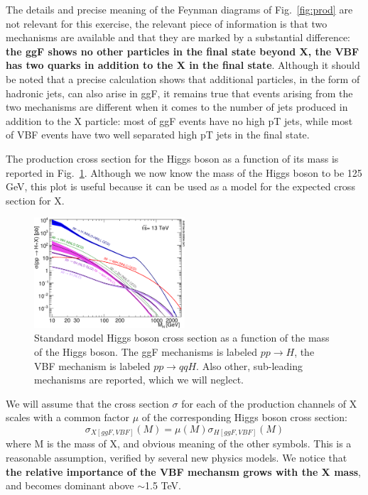 \documentclass[a4paper,12pt]{article}
\begin{document}
The details and precise meaning of the Feynman diagrams of Fig.~\ref{fig:prod}
are not relevant for this exercise, the relevant piece of information is that
two mechanisms are available and that they are marked by a substantial
difference: {\bf the ggF shows no other particles in the final state beyond X,
the VBF has two quarks in addition to the X in the final state}.
Although it should be noted that a precise calculation shows that additional
particles, in the form of hadronic jets, can also arise in ggF, it remains true
that events arising from the two mechanisms are different when it comes to the
number of jets produced in addition to the X particle: most of ggF events have
no high pT jets, while most of VBF events have two well separated high pT jets
in the final state.

The production cross section for the Higgs boson as a function of its mass is
reported in Fig.~\ref{fig:production}. Although we now know the mass of the
Higgs boson to be 125 GeV, this plot is useful because it can be used as a
model for the expected cross section for X.
\begin{figure}
 \centering 
 \includegraphics[width=0.5\textwidth]{images/plotAll_13tev_BSM_sqrt.png}
 \caption{Standard model Higgs boson cross section as a function of the mass
 of the Higgs boson. The ggF mechanisms is labeled $pp\rightarrow{}H$, the VBF
 mechanism is labeled $pp\rightarrow{}qqH$. Also other, sub-leading mechanisms
 are reported, which we will neglect.\label{fig:production}}
\end{figure}

We will assume that the cross section $\sigma$ for each of the production
channels of X scales with a common factor $\mu$ of the corresponding Higgs
boson cross section: 
\begin{equation}
 \sigma_{X [ggF,VBF]}(M) = \mu(M)\sigma_{H [ggF,VBF]}(M)
 \label{eq:mudef}
\end{equation}
 where M is the mass of X, and obvious meaning of the other symbols. This is a
 reasonable assumption, verified by several new physics models.  We notice
 that {\bf the relative importance of the VBF mechansm grows with the X mass},
 and becomes dominant above $\sim$1.5 TeV.
 
\end{document}
